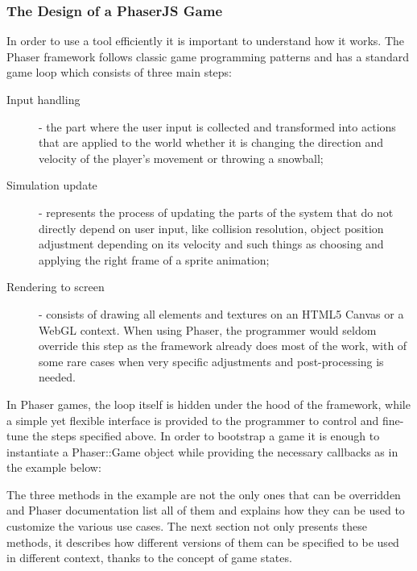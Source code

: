 \subsubsection{The Design of a PhaserJS Game}

In order to use a tool efficiently it is important to understand how it works.
The Phaser framework follows classic game programming patterns and has a
standard game loop which consists of three main steps:

\begin{description}

\item [Input handling] - the part where the user input is collected and
transformed into actions that are applied to the world whether it is changing
the direction and velocity of the player's movement or throwing a snowball;

\item [Simulation update] - represents the process of updating the parts of the
system that do not directly depend on user input, like collision resolution,
object position adjustment depending on its velocity and such things as choosing
and applying the right frame of a sprite animation;

\item [Rendering to screen] - consists of drawing all elements and textures on
an HTML5 Canvas or a WebGL context. When using Phaser, the programmer would
seldom override this step as the framework already does most of the work, with
of some rare cases when very specific adjustments and post-processing is needed.

\end{description}

In Phaser games, the loop itself is hidden under the hood of the framework,
while a simple yet flexible interface is provided to the programmer to control
and fine-tune the steps specified above. In order to bootstrap a game it is
enough to instantiate a Phaser::Game object while providing the necessary
callbacks as in the example below:



The three methods in the example are not the only ones that can be overridden
and Phaser documentation list all of them and explains how they can be used to
customize the various use cases. The next section not only presents these
methods, it describes how different versions of them can be specified to be used
in different context, thanks to the concept of game states.


